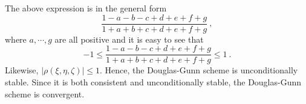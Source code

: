 \documentclass[12pt,a4paper]{article}
\begin{document}
The above expression is in the general form
\begin{equation*}
\dfrac{1-a-b-c+d+e+f+g}{1+a+b+c+d+e+f+g} ~,
\end{equation*}
where $a, \cdots ,g$ are all positive and it is easy to see that
\begin{equation*}
-1 \leqslant \dfrac{1-a-b-c+d+e+f+g}{1+a+b+c+d+e+f+g} \leqslant 1 ~.
\end{equation*}
Likewise, $|\rho(\xi, \eta, \zeta)| \leqslant 1$. Hence, the Douglas-Gunn scheme is unconditionally stable. Since it is both consistent and unconditionally stable, the Douglas-Gunn scheme is convergent.
\end{document}
